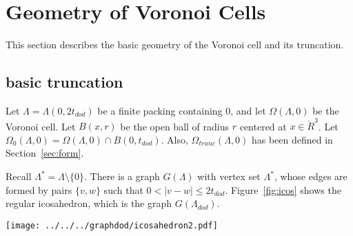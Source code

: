 

\section{Geometry of Voronoi Cells}

This section describes the basic geometry of the
 Voronoi cell and
its truncation.  

\subsection{basic truncation}\label{sec:in-ex}

Let $\Lambda = \Lambda(0,2t_{dod})$ be a finite
packing containing $0$, and let $\Omega(\Lambda,0)$ be the Voronoi cell.
Let $B(x,r)$ be the open ball of
radius $r$ centered at $x\in\ring{R}^3$.
Let $\Omega_0(\Lambda,0) = \Omega(\Lambda,0)\cap B(0,t_{dod})$.
Also, $\Omega_{trunc}(\Lambda,0)$ 
has been defined in Section~\ref{sec:form}.

Recall $\Lambda^* = \Lambda\setminus\{0\}$.  There is a graph $G(\Lambda)$
with vertex set $\Lambda^*$, whose edges are formed by pairs
$\{v,w\}$ such that $0<|v-w|\le 2t_{dod}$.  Figure~\ref{fig:icos}
shows the regular icosahedron, which is the graph $G(\Lambda_{dod})$.


\begin{floatingfigure}{30mm}
  \begin{center}
  \texttt{[image: ../../../graphdod/icosahedron2.pdf]}
   \end{center}
  \caption{}
\label{fig:icos}
\end{floatingfigure}

